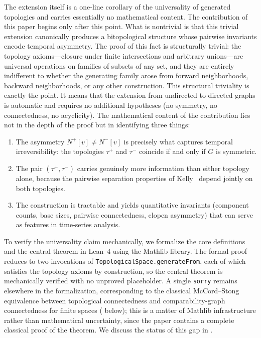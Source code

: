 \documentclass[11pt,a4paper]{article}
\theoremstyle{plain}
\theoremstyle{definition}
\newcommand{\Nfwd}[1]{N^{+}[#1]}
\newcommand{\Nbwd}[1]{N^{-}[#1]}
\newcommand{\taufwd}{\tau^{+}}
\newcommand{\taubwd}{\tau^{-}}
\begin{document}
The extension itself is a one-line corollary of the universality of generated topologies and carries essentially no mathematical content. The contribution of this paper begins only after this point. What is nontrivial is that this trivial extension canonically produces a bitopological structure whose pairwise invariants encode temporal asymmetry. The proof of this fact is structurally trivial: the topology axioms---closure
under finite intersections and arbitrary unions---are universal operations on
families of subsets of any set, and they are entirely indifferent to whether the
generating family arose from forward neighborhoods, backward neighborhoods, or
any other construction.  This structural triviality is exactly the point.  It
means that the extension from undirected to directed graphs is automatic and
requires no additional hypotheses (no symmetry, no connectedness, no acyclicity).
The mathematical content of the contribution lies not in the depth of the proof
but in identifying three things:
\begin{enumerate}[label=(\alph*),nosep]
  \item The asymmetry $\Nfwd{v} \neq \Nbwd{v}$ is precisely what captures
        temporal irreversibility: the topologies $\taufwd$ and $\taubwd$
        coincide if and only if $G$ is symmetric.
  \item The pair $(\taufwd, \taubwd)$ carries genuinely more information than
        either topology alone, because the pairwise separation properties of
        Kelly~\cite{Kelly1963} depend jointly on both topologies.
  \item The construction is tractable and yields quantitative invariants
        (component counts, base sizes, pairwise connectedness, clopen
        asymmetry) that can serve as features in time-series analysis.
\end{enumerate}

To verify the universality claim mechanically, we formalize the core
definitions and the central theorem in Lean~4 using the Mathlib library.
The formal proof reduces to two invocations of
\texttt{TopologicalSpace.generateFrom}, each of which satisfies the
topology axioms by construction, so the central theorem is mechanically
verified with no unproved placeholder.  A single \texttt{sorry} remains
elsewhere in the formalization, corresponding to the classical
McCord--Stong equivalence between topological connectedness and
comparability-graph connectedness for finite spaces
( below); this is a matter of
Mathlib infrastructure rather than mathematical uncertainty, since the
paper contains a complete classical proof of the theorem.  We discuss
the status of this gap in .
\end{document}
